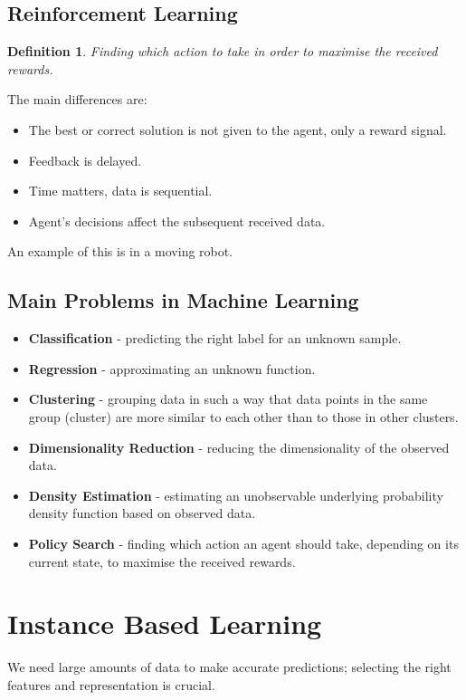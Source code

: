 \documentclass[11pt]{article}
\newtheorem{defn}{Definition}
\begin{document}
\subsection{Reinforcement Learning}
\begin{defn}
Finding which action to take in order to maximise the received rewards.
\end{defn}

The main differences are:
\begin{itemize}
  \item The best or correct solution is not given to the agent, only a reward signal.
  \item Feedback is delayed.
  \item Time matters, data is sequential.
  \item Agent's decisions affect the subsequent received data.
\end{itemize}

An example of this is in a moving robot.

\subsection{Main Problems in Machine Learning}
\begin{itemize}
  \item \textbf{Classification} - predicting the right label for an unknown sample.
  \item \textbf{Regression} - approximating an unknown function.
  \item \textbf{Clustering} - grouping data in such a way that data points in the same group (cluster) are more similar to each other than to those in other clusters.
  \item \textbf{Dimensionality Reduction} - reducing the dimensionality of the observed data.
  \item \textbf{Density Estimation} - estimating an unobservable underlying probability density function based on observed data.
  \item \textbf{Policy Search} - finding which action an agent should take, depending on its current state, to maximise the received rewards.
\end{itemize}

\section{Instance Based Learning}
We need large amounts of data to make accurate predictions; selecting the right features and representation is crucial.
\end{document}
